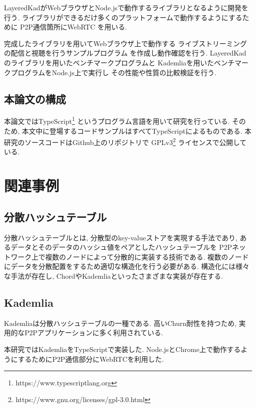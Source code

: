 \documentclass[sotsuron]{jcsie}
\begin{document}
LayeredKadがWebブラウザとNode.jsで動作するライブラリとなるように開発を行う.
ライブラリができるだけ多くのプラットフォームで動作するようにするために
P2P通信箇所にWebRTC \cite{WebRTCHo80:online}を用いる.

完成したライブラリを用いてWebブラウザ上で動作する
ライブストリーミングの配信と視聴を行うサンプルプログラム
を作成し動作確認を行う.
LayeredKadのライブラリを用いたベンチマークプログラムと
Kademliaを用いたベンチマークプログラムをNode.js上で実行し
その性能や性質の比較検証を行う.

\section{本論文の構成}
本論文ではTypeScript\footnote{https://www.typescriptlang.org}
というプログラム言語を用いて研究を行っている.
そのため, 本文中に登場するコードサンプルはすべてTypeScriptによるものである.
本研究のソースコードはGithub上のリポジトリ\cite{shinyosh38:online}で
GPLv3\footnote{https://www.gnu.org/licenses/gpl-3.0.html}
ライセンスで公開している.


\chapter{関連事例}
\section{分散ハッシュテーブル}
分散ハッシュテーブルとは, 分散型のkey-valueストアを実現する手法であり, 
あるデータとそのデータのハッシュ値をペアとしたハッシュテーブルを
P2Pネットワーク上で複数のノードによって分散的に実装する技術である.
複数のノードにデータを分散配置をするため適切な構造化を行う必要がある.
構造化には様々な手法が存在し, 
ChordやKademliaといったさまざまな実装が存在する.

\section{Kademlia}
Kademliaは分散ハッシュテーブルの一種である.
高いChurn耐性を持つため, 実用的なP2Pアプリケーションに多く利用されている.

本研究ではKademliaをTypeScriptで実装した.
Node.jsとChrome上で動作するようにするためにP2P通信部分にWebRTCを利用した.
\end{document}

